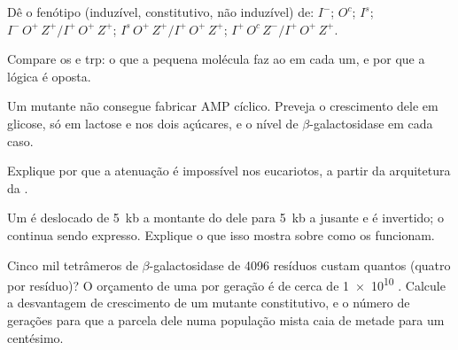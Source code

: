 \begin{exercise}[$\star\star$]\label{exo:b1:expression-control:5}
Dê o fenótipo (induzível, constitutivo, não induzível) de: $I^-$; $O^c$;
$I^s$; $I^-\,O^+\,Z^+ / I^+\,O^+\,Z^+$; $I^s\,O^+\,Z^+ /
I^+\,O^+\,Z^+$; $I^+\,O^c\,Z^- / I^+\,O^+\,Z^+$.
\end{exercise}

\begin{exercise}[$\star\star$]\label{exo:b1:expression-control:6}
Compare os  e trp: o que a pequena molécula faz ao 
em cada um, e por que a lógica é oposta.
\end{exercise}

\begin{exercise}[$\star\star$]\label{exo:b1:expression-control:7}
Um mutante não consegue fabricar AMP cíclico. Preveja o crescimento dele
em glicose, só em lactose e nos dois açúcares, e o nível de
$\beta$-galactosidase em cada caso.
\end{exercise}

\begin{exercise}[$\star\star$]\label{exo:b1:expression-control:8}
Explique por que a atenuação é impossível nos eucariotos, a partir da
arquitetura da .
\end{exercise}

\begin{exercise}[$\star\star$]\label{exo:b1:expression-control:9}
Um  é deslocado de \qty{5}{kb} a montante do  dele
para \qty{5}{kb} a jusante e é invertido; o  continua sendo
expresso. Explique o que isso mostra sobre como os 
funcionam.
\end{exercise}

\begin{exercise}[$\star\star\star$]\label{exo:b1:expression-control:10}
Cinco mil tetrâmeros de $\beta$-galactosidase de \qty{4096}{} resíduos
custam quantos  (quatro por resíduo)? O orçamento de uma  por
geração é de cerca de \qty{1e10}{} . Calcule a desvantagem de
crescimento de um mutante constitutivo, e o número de gerações para que
a parcela dele numa população mista caia de metade para um centésimo.
\end{exercise}

